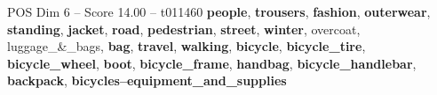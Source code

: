 \begin{textsample}{POS Dim 6 – Score 14.00 – t011460}  \label{ex:f6_pos_006}
\textbf{people}, \textbf{trousers}, \textbf{fashion}, \textbf{outerwear}, \textbf{standing}, \textbf{jacket}, \textbf{road}, \textbf{pedestrian}, \textbf{street}, \textbf{winter}, overcoat, luggage\_\&\_bags, \textbf{bag}, \textbf{travel}, \textbf{walking}, \textbf{bicycle}, \textbf{bicycle\_tire}, \textbf{bicycle\_wheel}, \textbf{boot}, \textbf{bicycle\_frame}, \textbf{handbag}, \textbf{bicycle\_handlebar}, \textbf{backpack}, \textbf{bicycles--equipment\_and\_supplies}

\end{textsample}
